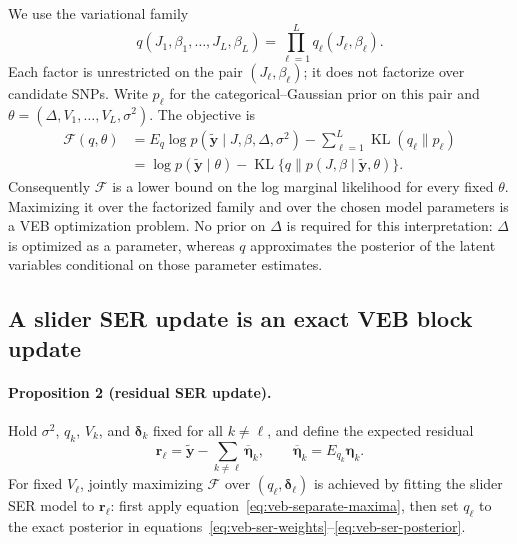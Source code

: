 \documentclass[11pt]{article}
\begin{document}
We use the variational family
\begin{equation}
q(J_1,\beta_1,\ldots,J_L,\beta_L)
  =\prod_{\ell=1}^Lq_\ell(J_\ell,\beta_\ell).
\label{eq:veb-family}
\end{equation}
Each factor is unrestricted on the pair $(J_\ell,\beta_\ell)$;
it does not factorize over candidate SNPs. Write $p_\ell$ for the
categorical--Gaussian prior on this pair and
$\theta=(\Delta,V_1,\ldots,V_L,\sigma^2)$. The objective is
\begin{align}
\mathcal F(q,\theta)
 &=E_q\log p(\widetilde{\mathbf y}\mid J,\beta,\Delta,\sigma^2)
   -\sum_{\ell=1}^L\operatorname{KL}(q_\ell\|p_\ell)
\label{eq:veb-elbo}\\
 &=\log p(\widetilde{\mathbf y}\mid\theta)
   -\operatorname{KL}\{q\|p(J,\beta\mid
                           \widetilde{\mathbf y},\theta)\}.
\label{eq:veb-bound-identity}
\end{align}
Consequently $\mathcal F$ is a lower bound on the log marginal
likelihood for every fixed $\theta$. Maximizing it over the
factorized family and over the chosen model parameters is a VEB
optimization problem. No prior on $\Delta$ is required for this
interpretation: $\Delta$ is optimized as a parameter, whereas
$q$ approximates the posterior of the latent variables conditional
on those parameter estimates.

\subsection{A slider SER update is an exact VEB block update}

\paragraph{Proposition 2 (residual SER update).}
Hold $\sigma^2$, $q_k$, $V_k$, and $\boldsymbol\delta_k$ fixed
for all $k\neq\ell$, and define the expected residual
\begin{equation}
\mathbf r_\ell=\widetilde{\mathbf y}
       -\sum_{k\neq\ell}\overline{\boldsymbol\eta}_k,
\qquad
\overline{\boldsymbol\eta}_k=E_{q_k}\boldsymbol\eta_k.
\label{eq:veb-expected-residual}
\end{equation}
For fixed $V_\ell$, jointly maximizing $\mathcal F$ over
$(q_\ell,\boldsymbol\delta_\ell)$ is achieved by fitting the
slider SER model to $\mathbf r_\ell$: first apply
equation~\eqref{eq:veb-separate-maxima}, then set $q_\ell$ to the
exact posterior in equations~\eqref{eq:veb-ser-weights}--\eqref{eq:veb-ser-posterior}.
\end{document}
